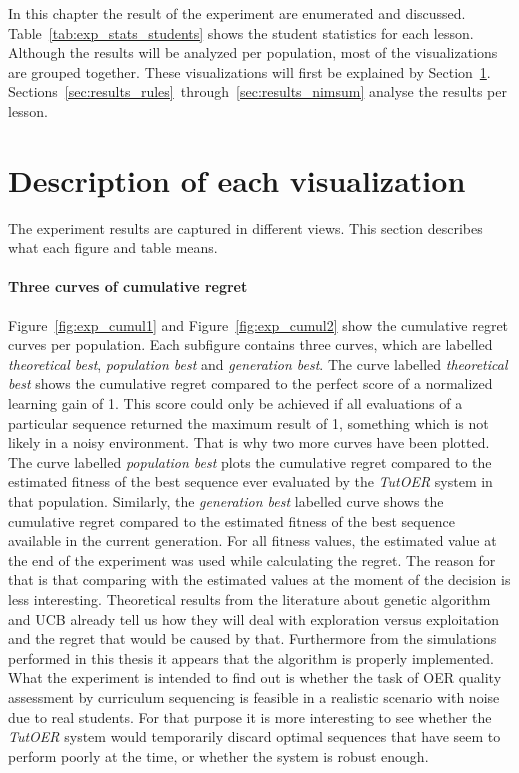In this chapter the result of the experiment are enumerated and discussed.
Table~\ref{tab:exp_stats_students} shows the student statistics for each
lesson. Although the results will be analyzed per population, most of the
visualizations are grouped together. These visualizations will first be
explained by Section~\ref{sec:results_explanation}.
Sections~\ref{sec:results_rules}~through~\ref{sec:results_nimsum}
analyse the results per lesson.


\section{Description of each visualization}
\label{sec:results_explanation}
The experiment results are captured in different views. This section describes
what each figure and table means.
\paragraph{Three curves of cumulative regret}
Figure~\ref{fig:exp_cumul1} and Figure~\ref{fig:exp_cumul2} show the cumulative
regret curves per population. Each subfigure contains three curves, which are
labelled \emph{theoretical best}, \emph{population best} and \emph{generation
best}. The curve labelled \emph{theoretical best} shows the cumulative regret
compared to the perfect score of a normalized learning gain of 1. This score
could only be achieved if all evaluations of a particular sequence returned the
maximum result of 1, something which is not likely in a noisy environment. That
is why two more curves have been plotted. The curve labelled \emph{population
best} plots the cumulative regret compared to the estimated fitness of the best
sequence ever evaluated by the \emph{TutOER} system in that population.
Similarly, the \emph{generation best} labelled curve shows the cumulative
regret compared to the estimated fitness of the best sequence available in the
current generation. For all fitness values, the estimated value at the end of
the experiment was used while calculating the regret. The reason for that is
that comparing with the estimated values at the moment of the decision is less
interesting. Theoretical results from the literature about genetic
algorithm and UCB already tell us how they will deal with exploration versus
exploitation and the regret that would be caused by that. Furthermore from the
simulations performed in this thesis it appears that the algorithm is properly
implemented. What the experiment is intended to find out is whether the task of
OER quality assessment by curriculum sequencing is feasible in a realistic
scenario with noise due to real students. For that purpose it is more
interesting to see whether the \emph{TutOER} system would temporarily discard
optimal sequences that have seem to perform poorly at the time, or whether the
system is robust enough.
